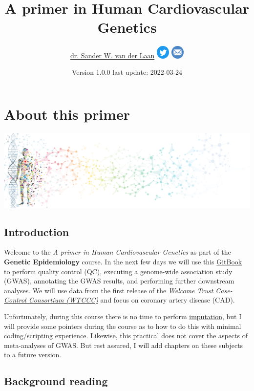 \documentclass[
]{book}
\title{A primer in Human Cardiovascular Genetics}
\author{\href{https://swvanderlaan.github.iio}{dr. Sander W. van der Laan} \href{https://www.twitter.com/swvanderlaan}{\includegraphics[width=0.05\textwidth,height=\textheight]{./img/_social_media/Twitter social icons - circle - blue.png}} \href{mailto:s.w.vanderlaan@gmail.com}{\includegraphics[width=0.05\textwidth,height=\textheight]{./img/_social_media/Email_icon.png}}}
\date{Version 1.0.0 \textbar{} last update: 2022-03-24}
\begin{document}
\maketitle

{
\setcounter{tocdepth}{1}
\tableofcontents
}
\hypertarget{about-this-primer}{%
\chapter{About this primer}\label{about-this-primer}}

\includegraphics{./img/banner_man_standing_dna.png}

\hypertarget{introduction}{%
\section{Introduction}\label{introduction}}

Welcome to the \emph{A primer in Human Cardiovascular Genetics} as part of the \textbf{Genetic Epidemiology} course. In the next few days we will use this \href{https://cjvanlissa.github.io/gitbook-demo/}{GitBook} to perform quality control (QC), executing a genome-wide association study (GWAS), annotating the GWAS results, and performing further downstream analyses. We will use data from the first release of the \href{https://www.wtccc.org.uk/ccc1/overview.html}{\emph{Welcome Trust Case-Control Consortium (WTCCC)}} and focus on coronary artery disease (CAD).

Unfortunately, during this course there is no time to perform \href{https://www.nature.com/articles/nrg2796}{imputation}, but I will provide some pointers during the course as to how to do this with minimal coding/scripting experience. Likewise, this practical does not cover the aspects of meta-analyses of GWAS. But rest assured, I will add chapters on these subjects to a future version.

\hypertarget{background-reading}{%
\section{Background reading}\label{background-reading}}
\end{document}
